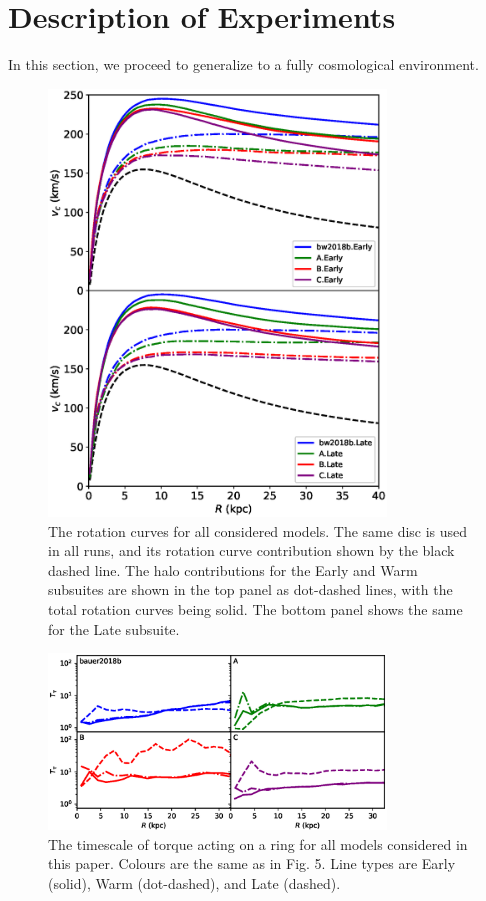 \section{Description of Experiments} \label{sec:description}



In this section, we proceed to generalize to a fully cosmological environment. 

\begin{figure}
	\centering
	\includegraphics[width=0.8\textwidth]{../figures/rotation_curve.eps}
	\caption{The rotation curves for all considered models. The same disc is used in all runs, and its rotation curve contribution shown by the black dashed line. The halo contributions  for the Early and Warm subsuites are shown in the top panel as dot-dashed lines, with the total rotation curves being solid. The bottom panel shows the same for the Late subsuite.} \label{fig:rotation_curves}
\end{figure}



\begin{figure}
	\centering
	\includegraphics[width=0.8\textwidth]{../figures/timescale.eps}\caption{The timescale of torque acting on a ring for all models considered in this paper. Colours are the same as in Fig. 5. Line types are Early (solid), Warm (dot-dashed), and Late (dashed).} \label{fig:ratio_freqs}
\end{figure}


